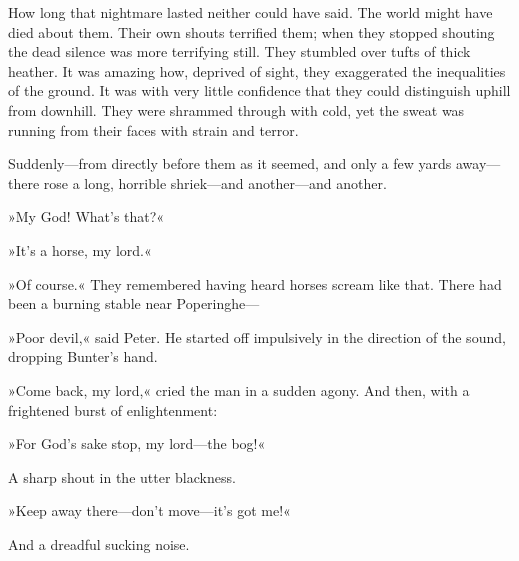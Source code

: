 How long that nightmare lasted neither could have said. The world might have died about them. Their own shouts terrified them; when they stopped shouting the dead silence was more terrifying still. They stumbled over tufts of thick heather. It was amazing how, deprived of sight, they exaggerated the inequalities of the ground. It was with very little confidence that they could distinguish uphill from downhill. They were shrammed through with cold, yet the sweat was running from their faces with strain and terror.

Suddenly—from directly before them as it seemed, and only a few yards away—there rose a long, horrible shriek—and another—and another.

»My God! What's that?«

»It's a horse, my lord.«

»Of course.« They remembered having heard horses scream like that. There had been a burning stable near Poperinghe—

»Poor devil,« said Peter. He started off impulsively in the direction of the sound, dropping Bunter's hand.

»Come back, my lord,« cried the man in a sudden agony. And then, with a frightened burst of enlightenment:

»For God's sake stop, my lord—the bog!«

A sharp shout in the utter blackness.

»Keep away there—don't move—it's got me!«

And a dreadful sucking noise.

